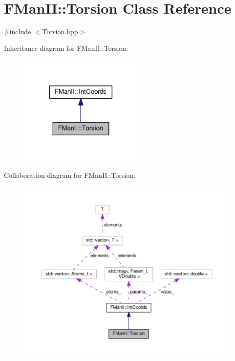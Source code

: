 \hypertarget{classFManII_1_1Torsion}{}\section{F\+Man\+II\+:\+:Torsion Class Reference}
\label{classFManII_1_1Torsion}


{\ttfamily \#include $<$Torsion.\+hpp$>$}



Inheritance diagram for F\+Man\+II\+:\+:Torsion\+:\nopagebreak
\begin{figure}[H]
\begin{center}
\leavevmode
\includegraphics[width=176pt]{classFManII_1_1Torsion__inherit__graph}
\end{center}
\end{figure}


Collaboration diagram for F\+Man\+II\+:\+:Torsion\+:\nopagebreak
\begin{figure}[H]
\begin{center}
\leavevmode
\includegraphics[width=350pt]{classFManII_1_1Torsion__coll__graph}
\end{center}
\end{figure}
